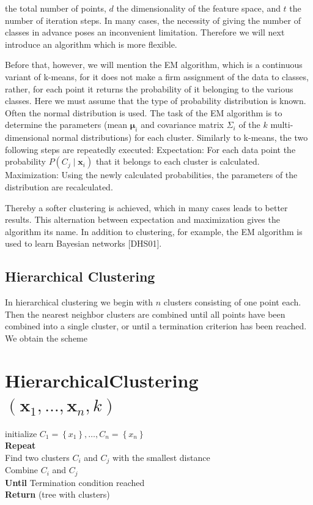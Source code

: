 \documentclass[10pt]{book}
\begin{document}
the total number of points, $d$ the dimensionality of the feature space, and $t$ the number of iteration steps.
In many cases, the necessity of giving the number of classes in advance poses an inconvenient limitation. Therefore we will next introduce an algorithm which is more flexible.

Before that, however, we will mention the EM algorithm, which is a continuous variant of k-means, for it does not make a firm assignment of the data to classes, rather, for each point it returns the probability of it belonging to the various classes. Here we must assume that the type of probability distribution is known. Often the normal distribution is used. The task of the EM algorithm is to determine the parameters (mean $\boldsymbol{\mu}_{i}$ and covariance matrix $\Sigma_{i}$ of the $k$ multi-dimensional normal distributions) for each cluster. Similarly to k-means, the two following steps are repeatedly executed:
Expectation: For each data point the probability $P\left(C_{j} \mid \boldsymbol{x}_{i}\right)$ that it belongs to each cluster is calculated.
Maximization: Using the newly calculated probabilities, the parameters of the distribution are recalculated.

Thereby a softer clustering is achieved, which in many cases leads to better results. This alternation between expectation and maximization gives the algorithm its name. In addition to clustering, for example, the EM algorithm is used to learn Bayesian networks [DHS01].

\subsection{Hierarchical Clustering}
In hierarchical clustering we begin with $n$ clusters consisting of one point each. Then the nearest neighbor clusters are combined until all points have been combined into a single cluster, or until a termination criterion has been reached. We obtain the scheme

\section{HierarchicalClustering $\left(\boldsymbol{x}_{1}, \ldots, \boldsymbol{x}_{n}, k\right)$}
initialize $C_{1}=\left\{x_{1}\right\}, \ldots, C_{n}=\left\{x_{n}\right\}$\\
\textbf{Repeat}\\
Find two clusters $C_{i}$ and $C_{j}$ with the smallest distance\\
Combine $C_{i}$ and $C_{j}$\\
\textbf{Until} Termination condition reached\\
\textbf{Return} (tree with clusters)
\end{document}
